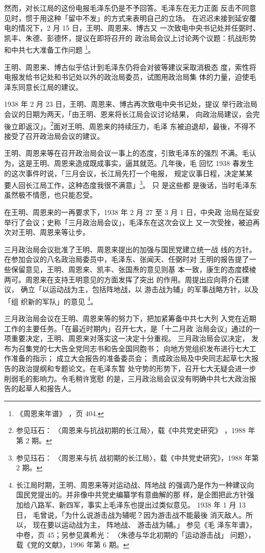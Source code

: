 然而，对长江局的这份电报毛泽东仍是不予回答。毛泽东在无力正面
反击不同意见时，惯于用这种「留中不发」的方式来表明自己的立场。
在迟迟未接到延安覆电的情况下，2 月 15 日，王明、周恩来、博古又
一次致电中央书记处并任弼时、凯丰、朱德、彭德怀，提议在即将召开的
政治局会议上讨论两个议题：抗战形势和中共七大准备工作问题
\footnote{《周恩来年谱》
，页 404.}。

王明、周恩来、博古似乎估计到毛泽东仍将会对彼等建议采取消极态
度，索性将电报发给书记处和书记处以外的政治局委员，试图用政治局集
体的力量，迫使毛泽东同意长江局的建议。

1938 年 2 月 23 日，王明、周恩来、博古再次致电中央书记处，提议
举行政治局会议的日期为两天，「由王明、恩来将长江局会议讨论结果，
向政治局建议，会完後立即返汉」。\footnote{参见珏石：
〈周恩来与抗战初期的长江局〉，载《中共党史研究》
，1988 年第 2 期。}面对王明、周恩来的持续压力，毛泽
东被迫退却，最後，不得不接受了召开政治局会议的建议。
 
王明、周恩来等在召开政治局会议一事上的态度，引致毛泽东的强烈 不满。毛认
为，这是王明、周恩来造成既成事实，逼其就范。几年後，毛 回忆 1938 春发生
的这次事件时说，「三月会议，长江局先打一个电报， 规定议事日程，决定某某
要人回长江局工作，这种态度我很不满意」\footnote{参见珏石： 〈周恩来与抗
战初期的长江局〉，载《中共党史研究》，1988 年第 2 期。}。 只 是这些都
是後话，当时毛泽东虽然极不情愿，也只能忍受。
 
在王明、周恩来的一再要求下，1938 年 2 月 27 至 3 月 1 日，中央政
治局在延安举行了会议；史称「三月政治局会议」，毛泽东在这次会议上
又一次受挫，被迫再次对王明、周恩来等让步。
 
三月政治局会议批准了王明、周恩来提出的加强与国民党建立统一战 线的方针。
在参加会议的八名政治局委员中，毛泽东、张闻天、任弼时对 王明的报告提了一
些保留意见，王明、周恩来、凯丰、张国焘的意见则基 本一致，康生的态度模棱
两可。周恩来在支持王明意见的方面发挥了突出 的作用。周提出应向蒋介石建议，
确立「以运动战为主，包括阵地战，以 游击战为辅」的军事战略方针，以及「组
织新的军队」的意见 \footnote{长江局时期，王明、周恩来等对运动战、阵地战
的强调乃是作为一种建议向国民党提出的。并非像中共党史编纂学有意曲解的那
样，是企图把此方针强加给八路军、新四军，事实上毛泽东也提出过类似意见。
1938 年 1 月 13 日， 毛曾说，「为什么说游击战为辅呢？因为游击战不能最後
消灭敌人。所以， 现在要以运动战为主， 阵地战、 游击战为辅。」 参见《毛
泽东年谱》，中卷，页 45；另参见龚希光： 〈朱德与华北初期的「运动游击战」
问题〉，载《党的文献》，1996 年第 6 期。 }。
 
三月政治局会议在王明、周恩来等的努力下，把加紧筹备中共七大列
入党在近期工作的主要任务。「在最近时期内」召开七大，是「十二月政
治局会议」通过的一项重要决定，王明、周恩来对落实这一决定十分重视。
三月政治局会议决定，
发布为召集党的七大告全党同志书和告全国同胞书；
向地方党组织发布进行七大工作准备的指示；
成立大会报告的准备委员会；
责成政治局及中央同志起草七大报告的政治提纲和专题论文。在毛泽东暂
处守势的形势下，召开七大无疑会进一步削弱毛的影响力。令毛稍许宽慰
的是，三月政治局会议没有明确中共七大政治报告的起草人和报告人。
 
